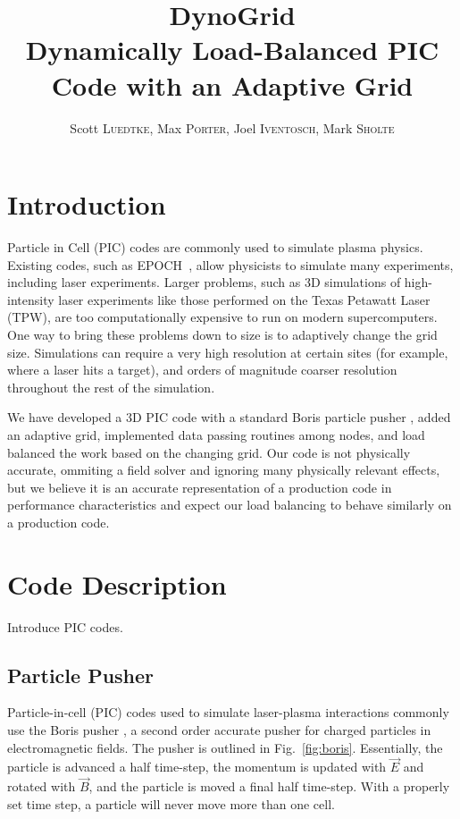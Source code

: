 \documentclass[]{article}
\begin{document}
\title{DynoGrid\\{\Large Dynamically Load-Balanced PIC Code with an Adaptive Grid}}

\author{Scott \textsc{Luedtke}, Max \textsc{Porter}, Joel \textsc{Iventosch}, Mark \textsc{Sholte}}

\maketitle

\section{Introduction}

Particle in Cell (PIC) codes are commonly used to simulate plasma physics.  Existing codes, such as EPOCH~\cite{epoch}, allow physicists to simulate many experiments, including laser experiments.  Larger problems, such as 3D simulations of high-intensity laser experiments like those performed on the Texas Petawatt Laser (TPW), are too computationally expensive to run on modern supercomputers.  One way to bring these problems down to size is to adaptively change the grid size.  Simulations can require a very high resolution at certain sites (for example, where a laser hits a target), and orders of magnitude coarser resolution throughout the rest of the simulation.

We have developed a 3D PIC code with a standard Boris particle pusher \cite{bird}, added an adaptive grid, implemented data passing routines among nodes, and load balanced the work based on the changing grid.  Our code is not physically accurate, ommiting a field solver and ignoring many physically relevant effects, but we believe it is an accurate representation of a production code in performance characteristics and expect our load balancing to behave similarly on a production code.


\section{Code Description}
Introduce PIC codes.

\subsection{Particle Pusher}
Particle-in-cell (PIC) codes used to simulate laser-plasma interactions commonly use the Boris pusher \cite{bird}, a second order accurate pusher for charged particles in electromagnetic fields.  The pusher is outlined in Fig.~\ref{fig:boris}.  Essentially, the particle is advanced a half time-step, the momentum is updated with $\vec{E}$ and rotated with $\vec{B}$, and the particle is moved a final half time-step.  With a properly set time step, a particle will never move more than one cell.
\end{document}
